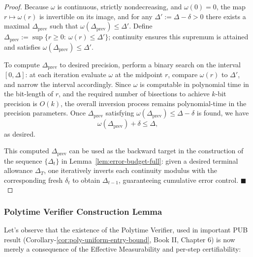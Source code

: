 \documentclass[12pt]{article}
\theoremstyle{definition}
\theoremstyle{plain}
\begin{document}
\begin{proof}
Because \(\omega\) is continuous, strictly nondecreasing, and \(\omega(0)=0\), the map \(r\mapsto \omega(r)\) is invertible on its image, and for any \(\Delta' := \Delta - \delta > 0\) there exists a maximal \(\Delta_{\mathrm{prev}}\) such that \(\omega(\Delta_{\mathrm{prev}}) \le \Delta'\). Define \(\Delta_{\mathrm{prev}} := \sup\{r\ge0:\ \omega(r)\le \Delta'\}\); continuity ensures this supremum is attained and satisfies \(\omega(\Delta_{\mathrm{prev}})\le \Delta'\).

To compute \(\Delta_{\mathrm{prev}}\) to desired precision, perform a binary search on the interval \([0,\Delta]\): at each iteration evaluate \(\omega\) at the midpoint \(r\), compare \(\omega(r)\) to \(\Delta'\), and narrow the interval accordingly. Since \(\omega\) is computable in polynomial time in the bit-length of \(r\), and the required number of bisections to achieve \(k\)-bit precision is \(O(k)\), the overall inversion process remains polynomial-time in the precision parameters. Once \(\Delta_{\mathrm{prev}}\) satisfying \(\omega(\Delta_{\mathrm{prev}})\le \Delta-\delta\) is found, we have
\[
\omega(\Delta_{\mathrm{prev}}) + \delta \le \Delta,
\]
as desired.

This computed \(\Delta_{\mathrm{prev}}\) can be used as the backward target in the construction of the sequence \(\{\Delta_t\}\) in Lemma~\ref{lem:error-budget-full}: given a desired terminal allowance \(\Delta_T\), one iteratively inverts each continuity modulus with the corresponding fresh \(\delta_t\) to obtain \(\Delta_{t-1}\), guaranteeing cumulative error control. \(\blacksquare\)
\end{proof}


\subsubsection{Polytime Verifier Construction Lemma}
Let's observe that the existence of the Polytime Verifier, used in important PUB result (Corollary-\ref{cor:poly-uniform-entry-bound}, Book II, Chapter 6) is now merely a consequence of the Effective Measurability and per-step certifiability:
\end{document}

